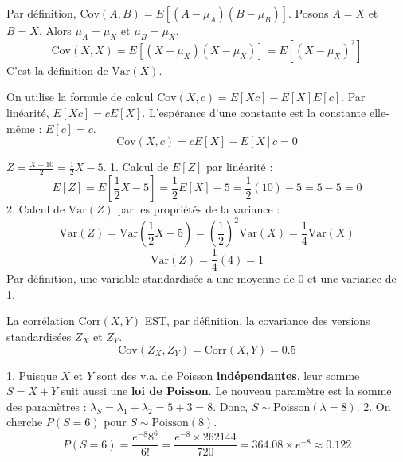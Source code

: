 \begin{correctionbox}
Par définition, $\text{Cov}(A, B) = E[(A-\mu_A)(B-\mu_B)]$.
Posons $A=X$ et $B=X$. Alors $\mu_A = \mu_X$ et $\mu_B = \mu_X$.
$$ \text{Cov}(X, X) = E[(X-\mu_X)(X-\mu_X)] = E[(X-\mu_X)^2] $$
C'est la définition de $\text{Var}(X)$.
\end{correctionbox}

\begin{correctionbox}
On utilise la formule de calcul $\text{Cov}(X,c) = E[Xc] - E[X]E[c]$.
Par linéarité, $E[Xc] = cE[X]$.
L'espérance d'une constante est la constante elle-même : $E[c] = c$.
$$ \text{Cov}(X, c) = cE[X] - E[X]c = 0 $$
\end{correctionbox}


\begin{correctionbox}
$Z = \frac{X - 10}{2} = \frac{1}{2}X - 5$.
1.  Calcul de $E[Z]$ par linéarité :
    $$ E[Z] = E\left[ \frac{1}{2}X - 5 \right] = \frac{1}{2}E[X] - 5 = \frac{1}{2}(10) - 5 = 5 - 5 = 0 $$
2.  Calcul de $\text{Var}(Z)$ par les propriétés de la variance :
    $$ \text{Var}(Z) = \text{Var}\left( \frac{1}{2}X - 5 \right) = \left(\frac{1}{2}\right)^2 \text{Var}(X) = \frac{1}{4} \text{Var}(X) $$
    $$ \text{Var}(Z) = \frac{1}{4}(4) = 1 $$
    Par définition, une variable standardisée a une moyenne de 0 et une variance de 1.
\end{correctionbox}

\begin{correctionbox}
La corrélation $\text{Corr}(X,Y)$ EST, par définition, la covariance des versions standardisées $Z_X$ et $Z_Y$.
$$ \text{Cov}(Z_X, Z_Y) = \text{Corr}(X,Y) = 0.5 $$
\end{correctionbox}

\begin{correctionbox}
1.  Puisque $X$ et $Y$ sont des v.a. de Poisson \textbf{indépendantes}, leur somme $S=X+Y$ suit aussi une \textbf{loi de Poisson}.
    Le nouveau paramètre est la somme des paramètres : $\lambda_S = \lambda_1 + \lambda_2 = 5 + 3 = 8$.
    Donc, $S \sim \text{Poisson}(\lambda=8)$.
2.  On cherche $P(S=6)$ pour $S \sim \text{Poisson}(8)$.
    $$ P(S=6) = \frac{e^{-8} 8^6}{6!} = \frac{e^{-8} \times 262144}{720} = 364.08 \times e^{-8} \approx 0.122 $$
\end{correctionbox}

